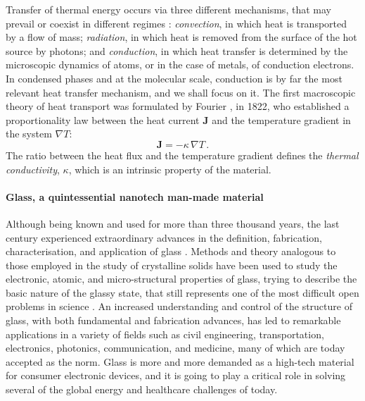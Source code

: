 Transfer of thermal energy occurs via three different mechanisms, that may prevail or coexist in different regimes \cite{Lienhard2017}: \emph{convection}, in which heat is transported by a flow of mass; \emph{radiation}, in which heat is removed from the surface of the hot source by photons; and \emph{conduction}, in which heat transfer is determined by the microscopic dynamics of atoms, or in the case of metals, of conduction electrons. 
In condensed phases and at the molecular scale, conduction is by far the most relevant heat transfer mechanism, and we shall focus on it. 
The first macroscopic theory of heat transport was formulated by Fourier \cite{Fourier1878}, in 1822, who established a proportionality law between the heat current $\mathbf{J}$ and the temperature gradient in the system $\nabla T$:
\begin{equation}
    \mathbf{J} = -\kappa\, \nabla T \,.  \label{eq:Fourier-law}
\end{equation}
The ratio between the heat flux and the temperature gradient defines the \emph{thermal conductivity}, $\kappa$, which is an intrinsic property of the material. 

\medskip

\paragraph{Glass, a quintessential nanotech man-made material}
Although being known and used for more than three thousand years, the last century experienced extraordinary advances in the definition, fabrication, characterisation, and application of glass \cite{Mauro2014}. 
Methods and theory analogous to those employed in the study of crystalline solids have been used to study the electronic, atomic, and micro-structural properties of glass, trying to describe the basic nature of the glassy state, that still represents one of the most difficult open problems in science \cite{MauroFM14}. 
An increased understanding and control of the structure of glass, with both fundamental and fabrication advances, has led to remarkable applications in a variety of fields such as civil engineering, transportation, electronics, photonics, communication, and medicine, many of which are today accepted as the norm. 
Glass is more and more demanded as a high-tech material for consumer electronic devices, and it is going to play a critical role in solving several of the global energy and healthcare challenges of today. 

